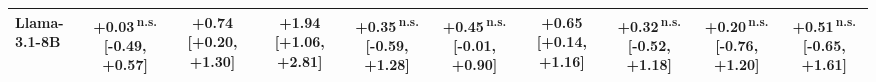 \begin{tabular}{lccccccccc}
Llama-3.1-8B & +0.03\,\textsuperscript{n.s.} {\scriptsize [-0.49, +0.57]} & \textbf{+0.74} {\scriptsize [+0.20, +1.30]} & \textbf{+1.94} {\scriptsize [+1.06, +2.81]} & +0.35\,\textsuperscript{n.s.} {\scriptsize [-0.59, +1.28]} & +0.45\,\textsuperscript{n.s.} {\scriptsize [-0.01, +0.90]} & \textbf{+0.65} {\scriptsize [+0.14, +1.16]} & +0.32\,\textsuperscript{n.s.} {\scriptsize [-0.52, +1.18]} & +0.20\,\textsuperscript{n.s.} {\scriptsize [-0.76, +1.20]} & +0.51\,\textsuperscript{n.s.} {\scriptsize [-0.65, +1.61]} \\
\bottomrule
\end{tabular}
